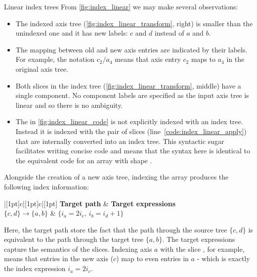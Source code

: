 \documentclass[thesis]{subfiles}
\begin{document}
\begin{example}{Linear index trees}
From \cref{fig:index_linear} we may make several observations:

\begin{itemize}
  \item
    The indexed axis tree (\cref{fig:index_linear_transform}, right) is smaller than the unindexed one and it has new labels: $c$ and $d$ instead of $a$ and $b$.

  \item
    The mapping between old and new axis entries are indicated by their labels.
    For example, the notation $c_2/a_4$ means that axis entry $c_2$ maps to $a_4$ in the original axis tree.

  \item
    Both slices in the index tree (\cref{fig:index_linear_transform}, middle) have a single component.
    No component labels are specified as the input axis tree is linear and so there is no ambiguity.

  \item
    The  in \cref{fig:index_linear_code} is not explicitly indexed with an index tree.
    Instead it is indexed with the pair of slices \pycode{[::2, 1::]} (line~\ref{code:index_linear_apply}) that are internally converted into an index tree.
    This syntactic sugar facilitates writing concise code and means that the syntax here is identical to the equivalent \numpy code for an array with shape .
\end{itemize}

Alongside the creation of a new axis tree, indexing the array produces the following index information:

\begin{center}
  \begin{tblr}{|[1pt]c|[1pt]c|[1pt]}
    \hline[1pt]
    \textbf{Target path} & \textbf{Target expressions} \\
    \hline[1pt]
    $\{ c, d \} \to \{a, b\}$ & $\{i_a = 2 i_c,\ i_b = i_d+1\}$ \\
    \hline[1pt]
  \end{tblr}
\end{center}

Here, the target path store the fact that the path through the source tree $\{c,d\}$ is equivalent to the path through the target tree $\{a,b\}$.
The target expressions capture the semantics of the slices.
Indexing axis $a$ with the slice \pycode{[::2]}, for example, means that entries in the new axis ($c$) map to even entries in $a$ - which is exactly the index expression $i_a = 2i_c$.


\end{example}
\end{document}
